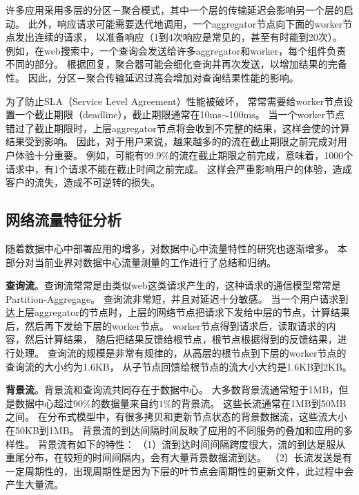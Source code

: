 许多应用采用多层的分区－聚合模式，其中一个层的传输延迟会影响另一个层的启动。
此外，响应请求可能需要迭代地调用，一个aggregator节点向下面的worker节点发出连续的请求，
以准备响应（1到4次响应是常见的，甚至有时能到20次）。
例如，在web搜索中，一个查询会发送给许多aggregator和worker，每个组件负责不同的部分。
根据回复，聚合器可能会细化查询并再次发送，以增加结果的完备性。
因此，分区－聚合传输延迟过高会增加对查询结果性能的影响。


为了防止SLA（Service Level Agreement）性能被破坏，
常常需要给worker节点设置一个截止期限（deadline），截止期限通常在10ms$\sim$100ms。
当一个worker节点错过了截止期限时，上层aggregator节点将会收到不完整的结果，这样会使的计算结果受到影响。
因此，对于用户来说，越来越多的的流在截止期限之前完成对用户体验十分重要。
例如，可能有$99.9\%$的流在截止期限之前完成，意味着，1000个请求中，有1个请求不能在截止时间之前完成。
这样会严重影响用户的体验，造成客户的流失，造成不可逆转的损失。

\subsection{网络流量特征分析}

随着数据中心中部署应用的增多，对数据中心中流量特性的研究也逐渐增多。
本部分对当前业界对数据中心流量测量的工作进行了总结和归纳。




\textbf{查询流}。查询流常常是由类似web这类请求产生的，这种请求的通信模型常常是Partition-Aggregage。
查询流非常短，并且对延迟十分敏感。
当一个用户请求到达上层aggregator的节点时，上层的网络节点把请求下发给中层的节点，计算结果后，然后再下发给下层的worker节点。
worker节点得到请求后，读取请求的内容，然后计算结果，
随后把结果反馈给根节点，根节点根据得到的反馈结果，进行处理。
查询流的规模是非常有规律的，从高层的根节点到下层的worker节点的查询流的大小约为1.6KB，
从子节点回馈给根节点的流大小大约是1.6KB到2KB。





\textbf{背景流}。背景流和查询流共同存在于数据中心。
大多数背景流通常短于1MB，但是数据中心超过$90\%$的数据量来自约$1\%$的背景流。
这些长流通常在1MB到50MB之间。
在分布式模型中，有很多拷贝和更新节点状态的背景数据流，这些流大小在50KB到1MB。
背景流的到达间隔时间反映了应用的不同服务的叠加和应用的多样性。
背景流有如下的特性：
（1）流到达时间间隔跨度很大，流的到达是服从重尾分布，在较短的时间间隔内，会有大量背景数据流到达。
（2）长流发送是有一定周期性的，出现周期性是因为下层的叶节点会周期性的更新文件，此过程中会产生大量流。





